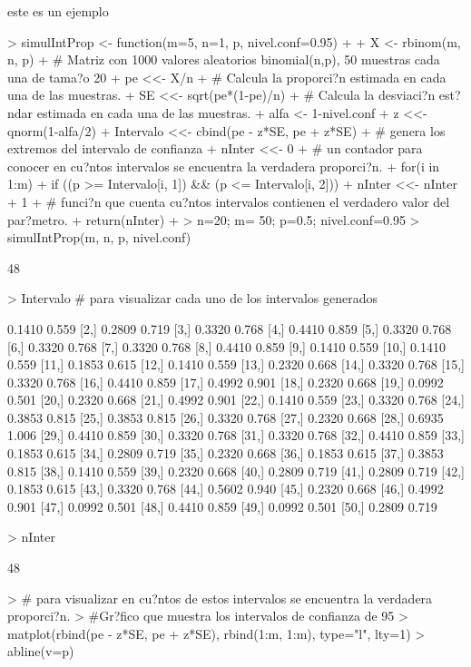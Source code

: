 \documentclass{article}
\begin{document}
este es un ejemplo
\begin{Schunk}
\begin{Sinput}
> simulIntProp <- function(m=5, n=1, p, nivel.conf=0.95)
+ {
+ X <- rbinom(m, n, p)
+ # Matriz con 1000 valores aleatorios binomial(n,p), 50 muestras cada una de tama?o 20
+ pe <<- X/n
+ # Calcula la proporci?n estimada en cada una de las muestras.
+ SE <<- sqrt(pe*(1-pe)/n)
+ # Calcula la desviaci?n est?ndar estimada en cada una de las muestras.
+ alfa <- 1-nivel.conf
+ z <<- qnorm(1-alfa/2)
+ Intervalo <<- cbind(pe - z*SE, pe + z*SE)
+ # genera los extremos del intervalo de confianza
+ nInter <<- 0
+ # un contador para conocer en cu?ntos intervalos se encuentra la verdadera proporci?n.
+ for(i in 1:m)
+ if ((p >= Intervalo[i, 1]) && (p <= Intervalo[i, 2]))
+ nInter <<- nInter + 1
+ # funci?n que cuenta cu?ntos intervalos contienen el verdadero valor del par?metro.
+ return(nInter)
+ }
> n=20; m= 50; p=0.5; nivel.conf=0.95
> simulIntProp(m, n, p, nivel.conf)
\end{Sinput}
\begin{Soutput}
[1] 48
\end{Soutput}
\begin{Sinput}
> Intervalo # para visualizar cada uno de los intervalos generados
\end{Sinput}
\begin{Soutput}
        [,1]  [,2]
 [1,] 0.1410 0.559
 [2,] 0.2809 0.719
 [3,] 0.3320 0.768
 [4,] 0.4410 0.859
 [5,] 0.3320 0.768
 [6,] 0.3320 0.768
 [7,] 0.3320 0.768
 [8,] 0.4410 0.859
 [9,] 0.1410 0.559
[10,] 0.1410 0.559
[11,] 0.1853 0.615
[12,] 0.1410 0.559
[13,] 0.2320 0.668
[14,] 0.3320 0.768
[15,] 0.3320 0.768
[16,] 0.4410 0.859
[17,] 0.4992 0.901
[18,] 0.2320 0.668
[19,] 0.0992 0.501
[20,] 0.2320 0.668
[21,] 0.4992 0.901
[22,] 0.1410 0.559
[23,] 0.3320 0.768
[24,] 0.3853 0.815
[25,] 0.3853 0.815
[26,] 0.3320 0.768
[27,] 0.2320 0.668
[28,] 0.6935 1.006
[29,] 0.4410 0.859
[30,] 0.3320 0.768
[31,] 0.3320 0.768
[32,] 0.4410 0.859
[33,] 0.1853 0.615
[34,] 0.2809 0.719
[35,] 0.2320 0.668
[36,] 0.1853 0.615
[37,] 0.3853 0.815
[38,] 0.1410 0.559
[39,] 0.2320 0.668
[40,] 0.2809 0.719
[41,] 0.2809 0.719
[42,] 0.1853 0.615
[43,] 0.3320 0.768
[44,] 0.5602 0.940
[45,] 0.2320 0.668
[46,] 0.4992 0.901
[47,] 0.0992 0.501
[48,] 0.4410 0.859
[49,] 0.0992 0.501
[50,] 0.2809 0.719
\end{Soutput}
\begin{Sinput}
> nInter
\end{Sinput}
\begin{Soutput}
[1] 48
\end{Soutput}
\begin{Sinput}
> # para visualizar en cu?ntos de estos intervalos se encuentra la verdadera proporci?n.
> #Gr?fico que muestra los intervalos de confianza de 95%
> matplot(rbind(pe - z*SE, pe + z*SE), rbind(1:m, 1:m), type="l", lty=1)
> abline(v=p)
\end{Sinput}
\end{Schunk}
\end{document}
